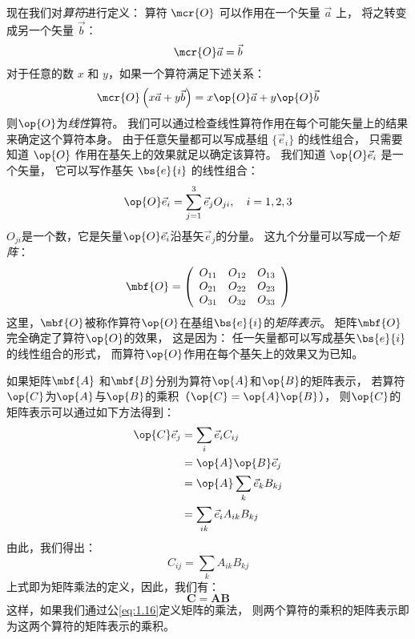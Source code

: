 现在我们对\emph{算符}进行定义：
算符 $\mcr{O}$ 可以作用在一个矢量 $\vec{a}$ 上，
将之转变成另一个矢量 $\vec{b}$：
\begin{equation}
 \mcr{O}\vec{a} = \vec{b}
 \label{eq:1.11}
\end{equation}
对于任意的数 $x$ 和 $y$，如果一个算符满足下述关系：
\begin{equation}
 \mcr{O}\left(x\vec{a} + y\vec{b}\right) = x\op{O}\vec{a} + y\op{O}\vec{b}
 \label{eq:1.12}
\end{equation}
则$\op{O}$为\emph{线性}算符。
我们可以通过检查线性算符作用在每个可能矢量上的结果来确定这个算符本身。
由于任意矢量都可以写成基组 $\{\vec{e}_i\}$ 的线性组合，
只需要知道 $\op{O}$ 作用在基矢上的效果就足以确定该算符。
我们知道 $\op{O}\vec{e}_i$ 是一个矢量，
它可以写作基矢 $\bs{e}{i}$ 的线性组合：
\begin{equation}
 \op{O}\vec{e}_i = \sum_{j=1}^3 \vec{e}_j O_{ji}, \quad i = 1, 2, 3
 \label{eq:1.13}
\end{equation}
$O_{ji}$是一个数，它是矢量$\op{O}\vec{e}_i$沿基矢$\vec{e}_j$的分量。
这九个分量可以写成一个\emph{矩阵}：
\begin{equation}
 \mbf{O} = \left(
 \begin{array}{ccc}
     O_{11} &O_{12} &O_{13} \\
     O_{21} &O_{22} &O_{23} \\
     O_{31} &O_{32} &O_{33} \\
 \end{array}
 \right)
 \label{eq:1.14}
\end{equation}
这里，$\mbf{O}$被称作算符$\op{O}$在基组$\bs{e}{i}$的\emph{矩阵表示}。
矩阵$\mbf{O}$完全确定了算符$\op{O}$的效果，
这是因为：
任一矢量都可以写成基矢$\bs{e}{i}$的线性组合的形式，
而算符$\op{O}$作用在每个基矢上的效果又为已知。


如果矩阵$\mbf{A}$ 和$\mbf{B}$分别为算符$\op{A}$和$\op{B}$的矩阵表示， 
若算符$\op{C}$为$\op{A}$与$\op{B}$的乘积（$\op{C} = \op{A}\op{B}$），
则$\op{C}$的矩阵表示可以通过如下方法得到：
\begin{equation}
 \begin{split}
 \op{C}\vec{e}_j &= \sum_i \vec{e}_i C_{ij} \\
 &= \op{A}\op{B} \vec{e}_j \\
 &= \op{A}\sum_k \vec{e}_k B_{kj} \\
 &= \sum_{ik} \vec{e}_i A_{ik}B_{kj}
 \end{split} 
 \label{eq:1.15}
\end{equation}
由此，我们得出：
\begin{equation}
 C_{ij} = \sum_k A_{ik}B_{kj}
 \label{eq:1.16}
\end{equation}
上式即为矩阵乘法的定义，因此，我们有：
\begin{equation}
 \mathbf{C} = \mathbf{A}\mathbf{B}
 \label{eq:1.17}
\end{equation}
这样，如果我们通过公\autoref{eq:1.16}定义矩阵的乘法，
则两个算符的乘积的矩阵表示即为这两个算符的矩阵表示的乘积。

